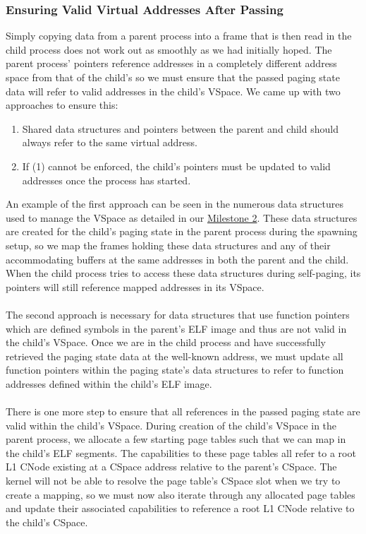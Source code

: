 \subsubsection{Ensuring Valid Virtual Addresses After Passing}
Simply copying data from a parent process into a frame that is then read in the child process does not work out as smoothly as we had initially hoped. The parent process' pointers reference addresses in a completely different address space from that of the child's so we must ensure that the passed paging state data will refer to valid addresses in the child's VSpace. We came up with two approaches to ensure this:
\begin{enumerate}
    \item Shared data structures and pointers between the parent and child should always refer to the same virtual address.
    \item If (1) cannot be enforced, the child's pointers must be updated to valid addresses once the process has started.
\end{enumerate}
An example of the first approach can be seen in the numerous data structures used to manage the VSpace as detailed in our \hyperref[M2]{Milestone 2}. These data structures are created for the child's paging state in the parent process during the spawning setup, so we map the frames holding these data structures and any of their accommodating buffers at the same addresses in both the parent and the child. When the child process tries to access these data structures during self-paging, its pointers will still reference mapped addresses in its VSpace.
\\\\
The second approach is necessary for data structures that use function pointers which are defined symbols in the parent's ELF image and thus are not valid in the child's VSpace. Once we are in the child process and have successfully retrieved the paging state data at the well-known address, we must update all function pointers within the paging state's data structures to refer to function addresses defined within the child's ELF image.
\\\\
There is one more step to ensure that all references in the passed paging state are valid within the child's VSpace. During creation of the child's VSpace in the parent process, we allocate a few starting page tables such that we can map in the child's ELF segments. The capabilities to these page tables all refer to a root L1 CNode existing at a CSpace address relative to the parent's CSpace. The kernel will not be able to resolve the page table's CSpace slot when we try to create a mapping, so we must now also iterate through any allocated page tables and update their associated capabilities to reference a root L1 CNode relative to the child's CSpace.

